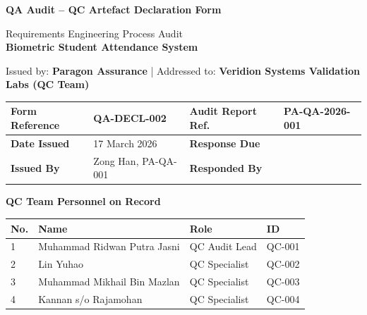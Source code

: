 \documentclass[11pt,a4paper]{article}
\begin{document}
\begin{center}
\LARGE\textbf{QA Audit -- QC Artefact Declaration Form}

\vspace{0.3cm}
\large Requirements Engineering Process Audit \\
\textbf{Biometric Student Attendance System}

\vspace{0.2cm}
\normalsize
Issued by: \textbf{Paragon Assurance} \quad|\quad
Addressed to: \textbf{Veridion Systems Validation Labs (QC Team)}
\end{center}

\vspace{0.3cm}

\begin{table}[H]
\centering
\small
\renewcommand{\arraystretch}{1.6}
\begin{tabularx}{\textwidth}{|p{}|X|p{}|X|}
\hline
\rowcolor{tableheader}
\textbf{Form Reference} & QA-DECL-002 &
\textbf{Audit Report Ref.} & PA-QA-2026-001 \\
\hline
\textbf{Date Issued} & 17 March 2026 &
\textbf{Response Due} & \underline{\hspace{3cm}} \\
\hline
\textbf{Issued By} & Zong Han, PA-QA-001 &
\textbf{Responded By} & \underline{\hspace{3cm}} \\
\hline
\end{tabularx}
\end{table}

\vspace{0.2cm}

\noindent\colorbox{tableheader}{\begin{minipage}{\dimexpr\textwidth-2\fboxsep\relax}
\textbf{QC Team Personnel on Record}
\end{minipage}}

\vspace{0.2cm}

\renewcommand{\arraystretch}{1.5}
\begin{table}[H]
\centering
\small
\begin{tabularx}{\textwidth}{|p{}|p{}|X|p{}|}
\hline
\rowcolor{tableheader}
\textbf{No.} & \textbf{Name} & \textbf{Role} & \textbf{ID} \\
\hline
1 & Muhammad Ridwan Putra Jasni & QC Audit Lead & QC-001 \\
\hline
2 & Lin Yuhao & QC Specialist & QC-002 \\
\hline
3 & Muhammad Mikhail Bin Mazlan & QC Specialist & QC-003 \\
\hline
4 & Kannan s/o Rajamohan & QC Specialist & QC-004 \\
\hline
\end{tabularx}
\end{table}
\end{document}
